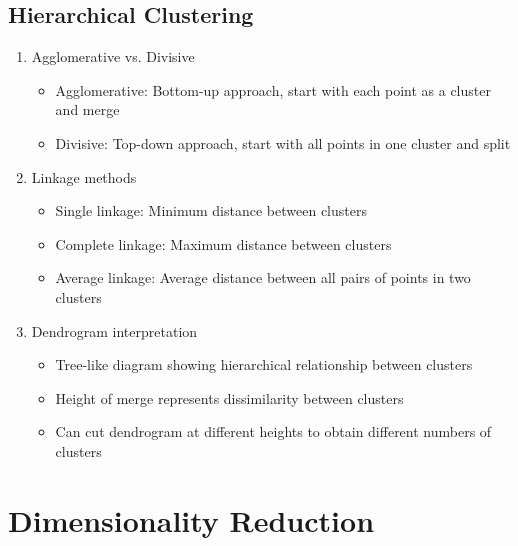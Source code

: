 \documentclass{article}
\begin{document}
\subsection{Hierarchical Clustering}
\begin{enumerate}
    \item Agglomerative vs. Divisive
    \begin{itemize}
        \item Agglomerative: Bottom-up approach, start with each point as a cluster and merge
        \item Divisive: Top-down approach, start with all points in one cluster and split
    \end{itemize}
    
    \item Linkage methods
    \begin{itemize}
        \item Single linkage: Minimum distance between clusters
        \item Complete linkage: Maximum distance between clusters
        \item Average linkage: Average distance between all pairs of points in two clusters
    \end{itemize}
    
    \item Dendrogram interpretation
    \begin{itemize}
        \item Tree-like diagram showing hierarchical relationship between clusters
        \item Height of merge represents dissimilarity between clusters
        \item Can cut dendrogram at different heights to obtain different numbers of clusters
    \end{itemize}
\end{enumerate}

\section{Dimensionality Reduction}
\end{document}
